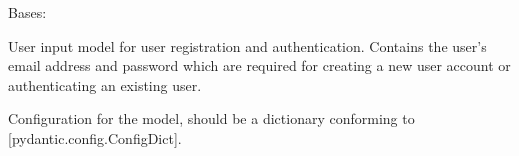\documentclass[letterpaper,10pt,openany,oneside,english]{sphinxmanual}
\begin{document}
\begin{savenotes}\begin{fulllineitems}

\pysigstartsignatures
{}
\pysigstopsignatures
\sphinxAtStartPar
Bases: 

\sphinxAtStartPar
User input model for user registration and authentication.
Contains the user’s email address and password which are required
for creating a new user account or authenticating an existing user.


\begin{savenotes}\begin{fulllineitems}

\pysigstartsignatures
{}
\pysigstopsignatures
\end{fulllineitems}\end{savenotes}



\begin{savenotes}\begin{fulllineitems}

\pysigstartsignatures
{}
\pysigstopsignatures
\sphinxAtStartPar
Configuration for the model, should be a dictionary conforming to {[}\sphinxtitleref{ConfigDict}{]}{[}pydantic.config.ConfigDict{]}.

\end{fulllineitems}\end{savenotes}



\begin{savenotes}\begin{fulllineitems}

\pysigstartsignatures
{}
\pysigstopsignatures
\end{fulllineitems}\end{savenotes}


\end{fulllineitems}\end{savenotes}
\end{document}
